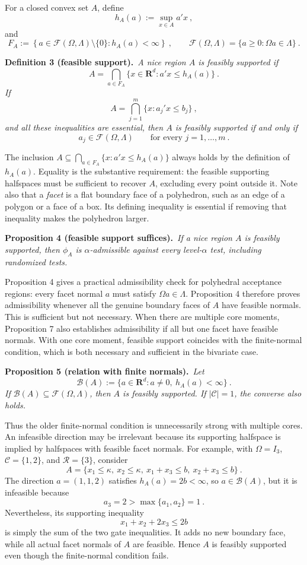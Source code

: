 \documentclass[11pt]{article}
\newcommand{\R}{\mathbf R}
\newcommand{\cC}{\mathcal C}
\newcommand{\cR}{\mathcal R}
\newcommand{\cF}{\mathcal F}
\newcommand{\1}{\mathbf 1}
\newcommand{\result}[2]{%
  \par\medskip\noindent
  \begingroup\color{navy}\textbf{#1.}\endgroup\ \emph{#2}\par\smallskip}
\begin{document}
For a closed convex set $A$, define
\[
h_A(a):=\sup_{x\in A}a'x
~,
\]
and
\[
F_A
:=
\left\{
a\in\mathcal F(\Omega,\Lambda)\setminus\{0\}:
h_A(a)<\infty
\right\}~,
\qquad
\mathcal F(\Omega,\Lambda)
=
\{a\ge0:\Omega a\in\Lambda\}~.
\]

\result{Definition 3 (feasible support)}{A nice region $A$ is feasibly
supported if
\[
A
=
\bigcap_{a\in F_A}
\{x\in\mathbf R^d:a'x\le h_A(a)\}~.
\]
If
\[
A=\bigcap_{j=1}^m\{x:a_j'x\le b_j\}~,
\]
and all these inequalities are essential, then $A$ is feasibly
supported if and only if
\[
a_j\in\cF(\Omega,\Lambda)
\qquad\text{for every }j=1,\ldots,m~.
\]}

The inclusion $A\subseteq\bigcap_{a\in F_A}\{x:a'x\le h_A(a)\}$ always holds by the definition of \(h_A(a)\). Equality is the substantive requirement: the feasible supporting halfspaces must be sufficient to recover \(A\), excluding every point outside it. Note also that a \emph{facet} is a flat boundary face of a polyhedron, such as an edge of a polygon or a face of a box. Its defining inequality is essential if removing that inequality makes the polyhedron larger.

\result{Proposition 4 (feasible support suffices)}{If a nice region $A$ is
feasibly supported, then $\phi_A$ is $\alpha$-admissible against every
level-$\alpha$ test, including randomized tests.}

Proposition 4 gives a practical admissibility check for polyhedral acceptance regions: every facet normal \(a\) must satisfy \(\Omega a\in\Lambda\). Proposition 4 therefore proves admissibility whenever all the genuine boundary faces of \(A\) have feasible normals. This is sufficient but not necessary. When there are multiple core moments, Proposition 7 also establishes admissibility if all but one facet have feasible normals. With one core moment, feasible support coincides with the finite-normal condition, which is both necessary and sufficient in the bivariate case.

\result{Proposition 5 (relation with finite normals)}{Let
\[
\mathcal B(A):=\{a\in\R^d:a\ne0,\ h_A(a)<\infty\}~.
\]
If $\mathcal B(A)\subseteq\cF(\Omega,\Lambda)$, then $A$ is feasibly
supported. If $|\cC|=1$, the converse also holds.}

Thus the older finite-normal condition is unnecessarily strong with multiple cores. An infeasible direction may be irrelevant because its supporting halfspace is implied by halfspaces with feasible facet normals. For example, with \(\Omega=I_3\), \(\cC=\{1,2\}\), and \(\cR=\{3\}\), consider
\[
A=\{x_1\le\kappa,\ x_2\le\kappa,\ x_1+x_3\le b,\ x_2+x_3\le b\}~.
\]
The direction \(a=(1,1,2)\) satisfies \(h_A(a)=2b<\infty\), so $a\in\mathcal B(A)$, but it is infeasible because
\[
a_3=2>\max\{a_1,a_2\}=1~.
\]
Nevertheless, its supporting inequality
\[
x_1+x_2+2x_3\le2b
\]
is simply the sum of the two gate inequalities. It adds no new boundary face, while all actual facet normals of \(A\) are feasible. Hence \(A\) is feasibly supported even though the finite-normal condition fails.
\end{document}
